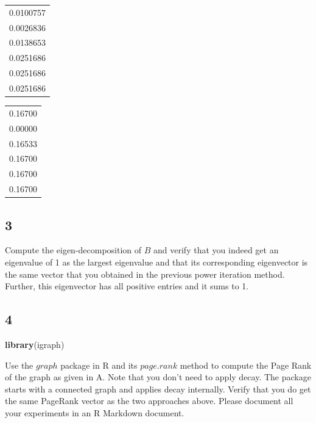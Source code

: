 \documentclass[]{article}
\newenvironment{Shaded}{\begin{snugshade}}{\end{snugshade}}
\newcommand{\KeywordTok}[1]{\textcolor[rgb]{0.13,0.29,0.53}{\textbf{{#1}}}}
\newcommand{\StringTok}[1]{\textcolor[rgb]{0.31,0.60,0.02}{{#1}}}
\newcommand{\NormalTok}[1]{{#1}}
\begin{document}
\begin{longtable}[]{@{}r@{}}
\toprule
0.0100757\tabularnewline
0.0026836\tabularnewline
0.0138653\tabularnewline
0.0251686\tabularnewline
0.0251686\tabularnewline
0.0251686\tabularnewline
\bottomrule
\end{longtable}

\begin{Shaded}
\end{Shaded}

\begin{longtable}[]{@{}r@{}}
\toprule
0.16700\tabularnewline
0.00000\tabularnewline
0.16533\tabularnewline
0.16700\tabularnewline
0.16700\tabularnewline
0.16700\tabularnewline
\bottomrule
\end{longtable}

\subsection{3}\label{section-2}

Compute the eigen-decomposition of \(B\) and verify that you indeed get
an eigenvalue of 1 as the largest eigenvalue and that its corresponding
eigenvector is the same vector that you obtained in the previous power
iteration method. Further, this eigenvector has all positive entries and
it sums to 1.

\newpage

\subsection{4}\label{section-3}

\begin{Shaded}
\begin{Highlighting}[]
\KeywordTok{library}\NormalTok{(igraph)}
\end{Highlighting}
\end{Shaded}

Use the \(graph\) package in R and its \(page.rank\) method to compute
the Page Rank of the graph as given in A. Note that you don't need to
apply decay. The package starts with a connected graph and applies decay
internally. Verify that you do get the same PageRank vector as the two
approaches above. Please document all your experiments in an R Markdown
document.
\end{document}
